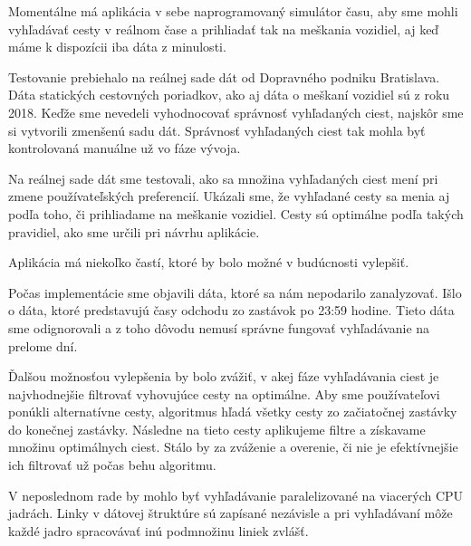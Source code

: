 Momentálne má aplikácia v sebe naprogramovaný simulátor času, aby sme mohli vyhľadávať cesty v reálnom čase a prihliadať tak na meškania vozidiel, aj keď máme k dispozícii iba dáta z minulosti. 

Testovanie prebiehalo na reálnej sade dát od Dopravného podniku Bratislava. Dáta statických cestovných poriadkov, ako aj dáta o meškaní vozidiel sú z roku 2018. Keďže sme nevedeli vyhodnocovať správnosť vyhľadaných ciest, najskôr sme si vytvorili zmenšenú sadu dát. Správnosť vyhľadaných ciest tak mohla byť kontrolovaná manuálne už vo fáze vývoja. 

Na reálnej sade dát sme testovali, ako sa množina vyhľadaných ciest mení pri zmene používateľských preferencií. Ukázali sme, že vyhľadané cesty sa menia aj podľa toho, či prihliadame na meškanie vozidiel. Cesty sú optimálne podľa takých pravidiel, ako sme určili pri návrhu aplikácie. 

Aplikácia má niekoľko častí, ktoré by bolo možné v budúcnosti vylepšiť. 

Počas implementácie sme objavili dáta, ktoré sa nám nepodarilo zanalyzovať. Išlo o dáta, ktoré predstavujú časy odchodu zo zastávok po 23:59 hodine. Tieto dáta sme odignorovali a z toho dôvodu nemusí správne fungovať vyhľadávanie na prelome dní. 

Ďalšou možnosťou vylepšenia by bolo zvážiť, v akej fáze vyhľadávania ciest je najvhodnejšie filtrovať vyhovujúce cesty na optimálne. Aby sme používateľovi ponúkli alternatívne cesty, algoritmus hľadá všetky cesty zo začiatočnej zastávky do konečnej zastávky. Následne na tieto cesty aplikujeme filtre a získavame množinu optimálnych ciest. Stálo by za zváženie a overenie, či nie je efektívnejšie ich filtrovať už počas behu algoritmu.

V neposlednom rade by mohlo byť vyhľadávanie paralelizované na viacerých CPU jadrách. Linky v dátovej štruktúre sú zapísané nezávisle a pri vyhľadávaní môže každé jadro spracovávať inú podmnožinu liniek zvlášť.

